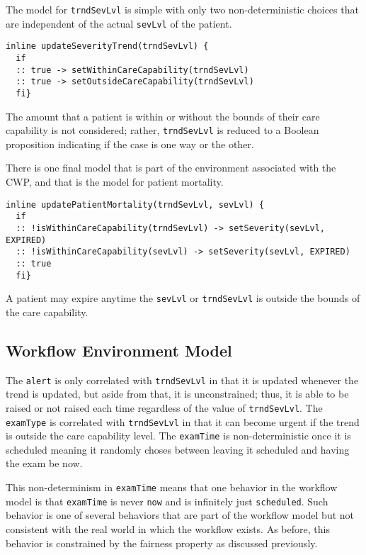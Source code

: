 The model for \texttt{trndSevLvl} is simple with only two non-deterministic choices that are independent of the actual \texttt{sevLvl} of the patient. 
%
{\small
\begin{lstlisting}[style=myPromela]
inline updateSeverityTrend(trndSevLvl) {
  if
  :: true -> setWithinCareCapability(trndSevLvl)
  :: true -> setOutsideCareCapability(trndSevLvl)
  fi}
\end{lstlisting}
}
%
\noindent The amount that a patient is within or without the bounds of their care capability is not considered; rather, \texttt{trndSevLvl} is reduced to a Boolean proposition indicating if the case is one way or the other.

There is one final model that is part of the environment associated with the CWP, and that is the model for patient mortality. 
%
{\small
\begin{lstlisting}[style=myPromela]
inline updatePatientMortality(trndSevLvl, sevLvl) {
  if
  :: !isWithinCareCapability(trndSevLvl) -> setSeverity(sevLvl, EXPIRED)
  :: !isWithinCareCapability(sevLvl) -> setSeverity(sevLvl, EXPIRED)
  :: true
  fi}
\end{lstlisting}
}
%
\noindent A patient may expire anytime the \texttt{sevLvl} or \texttt{trndSevLvl} is outside the bounds of the care capability.

\subsection{Workflow Environment Model}

\begin{comment}
The workflow itself has state not just for where the tokens are located as discussed is \secref{sec:bpmn}. It makes decisions at different points based on the values of \texttt{alert}, \texttt{examType}, and \texttt{examTime}. Their values are updated by their associated tasks in the workflow, but how the values evolve over time is not specified. As such, they are modeled as inputs provided by the environment which are sampled when their associated tasks are activated.
\end{comment}

The \texttt{alert} is only correlated with \texttt{trndSevLvl} in that it is updated whenever the trend is updated, but aside from that, it is unconstrained; thus, it is able to be raised or not raised each time regardless of the value of \texttt{trndSevLvl}. The \texttt{examType} is correlated with \texttt{trndSevLvl} in that it can become urgent if the trend is outside the care capability level. The \texttt{examTime} is non-deterministic once it is scheduled meaning it randomly choses between leaving it scheduled and having the exam be now.

This non-determinism in \texttt{examTime} means that one behavior in the workflow model is that \texttt{examTime} is never \texttt{now} and is infinitely just \texttt{scheduled}. Such behavior is one of several behaviors that are part of the workflow model but not consistent with the real world in which the workflow exists. As before, this behavior is constrained by the fairness property as discussed previously.
